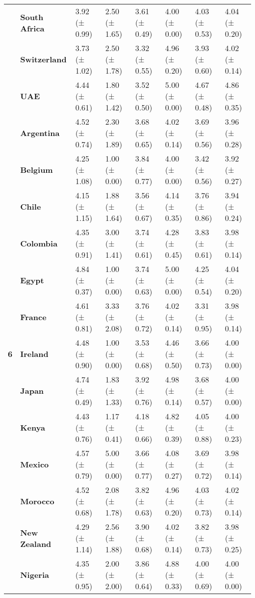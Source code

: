 \begin{longtable}{llllllll}
\textbf{} & \textbf{South Africa} & 3.92 (± 0.99) & 2.50 (± 1.65) & 3.61 (± 0.49) & 4.00 (± 0.00) & 4.03 (± 0.53) & 4.04 (± 0.20) \\
\textbf{} & \textbf{Switzerland} & 3.73 (± 1.02) & 2.50 (± 1.78) & 3.32 (± 0.55) & 4.96 (± 0.20) & 3.93 (± 0.60) & 4.02 (± 0.14) \\
\textbf{} & \textbf{UAE} & 4.44 (± 0.61) & 1.80 (± 1.42) & 3.52 (± 0.50) & 5.00 (± 0.00) & 4.67 (± 0.48) & 4.86 (± 0.35) \\
\cline{1-8}
\multirow[t]{19}{*}{\textbf{6}} & \textbf{Argentina} & 4.52 (± 0.74) & 2.30 (± 1.89) & 3.68 (± 0.65) & 4.02 (± 0.14) & 3.69 (± 0.56) & 3.96 (± 0.28) \\
\textbf{} & \textbf{Belgium} & 4.25 (± 1.08) & 1.00 (± 0.00) & 3.84 (± 0.77) & 4.00 (± 0.00) & 3.42 (± 0.56) & 3.92 (± 0.27) \\
\textbf{} & \textbf{Chile} & 4.15 (± 1.15) & 1.88 (± 1.64) & 3.56 (± 0.67) & 4.14 (± 0.35) & 3.76 (± 0.86) & 3.94 (± 0.24) \\
\textbf{} & \textbf{Colombia} & 4.35 (± 0.91) & 3.00 (± 1.41) & 3.74 (± 0.61) & 4.28 (± 0.45) & 3.83 (± 0.61) & 3.98 (± 0.14) \\
\textbf{} & \textbf{Egypt} & 4.84 (± 0.37) & 1.00 (± 0.00) & 3.74 (± 0.63) & 5.00 (± 0.00) & 4.25 (± 0.54) & 4.04 (± 0.20) \\
\textbf{} & \textbf{France} & 4.61 (± 0.81) & 3.33 (± 2.08) & 3.76 (± 0.72) & 4.02 (± 0.14) & 3.31 (± 0.95) & 3.98 (± 0.14) \\
\textbf{} & \textbf{Ireland} & 4.48 (± 0.90) & 1.00 (± 0.00) & 3.53 (± 0.68) & 4.46 (± 0.50) & 3.66 (± 0.73) & 4.00 (± 0.00) \\
\textbf{} & \textbf{Japan} & 4.74 (± 0.49) & 1.83 (± 1.33) & 3.92 (± 0.76) & 4.98 (± 0.14) & 3.68 (± 0.57) & 4.00 (± 0.00) \\
\textbf{} & \textbf{Kenya} & 4.43 (± 0.76) & 1.17 (± 0.41) & 4.18 (± 0.66) & 4.82 (± 0.39) & 4.05 (± 0.88) & 4.00 (± 0.23) \\
\textbf{} & \textbf{Mexico} & 4.57 (± 0.79) & 5.00 (± 0.00) & 3.66 (± 0.77) & 4.08 (± 0.27) & 3.69 (± 0.72) & 3.98 (± 0.14) \\
\textbf{} & \textbf{Morocco} & 4.52 (± 0.68) & 2.08 (± 1.78) & 3.82 (± 0.63) & 4.96 (± 0.20) & 4.03 (± 0.73) & 4.02 (± 0.14) \\
\textbf{} & \textbf{New Zealand} & 4.29 (± 1.14) & 2.56 (± 1.88) & 3.90 (± 0.68) & 4.02 (± 0.14) & 3.82 (± 0.73) & 3.98 (± 0.25) \\
\textbf{} & \textbf{Nigeria} & 4.35 (± 0.95) & 2.00 (± 2.00) & 3.86 (± 0.64) & 4.88 (± 0.33) & 4.00 (± 0.69) & 4.00 (± 0.00) \\

\end{longtable}
